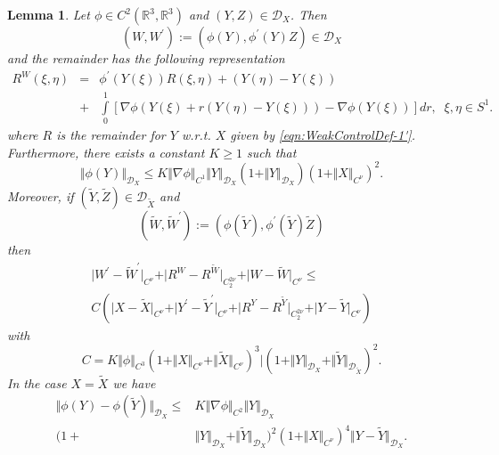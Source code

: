 \documentclass[11pt,a4paper,leqno]{amsart}%
\theoremstyle{plain}
\theoremstyle{remark}
\theoremstyle{plain}
\newtheorem{lemma}[theorem]{Lemma}
\numberwithin{equation}{section}
\def\Rnu{{\mathbb R}}
\def\intl{\int\limits}
\begin{document}
\begin{lemma}\label{lem:RegularMap}
Let $\phi\in C^2(\Rnu^3,\Rnu^3)$ and $(Y,Z)\in \mathcal{D}_X$.
Then
\begin{equation}
(W,W^\prime):=(\phi(Y),\phi^\prime(Y)Z)\in
\mathcal{D}_X\label{eqn:RegularMap-1}
\end{equation}
and the remainder has the following representation
\begin{eqnarray}
R^{W}(\xi,\eta)&=&\phi^\prime(Y(\xi))R(\xi,\eta)+
(Y(\eta)-Y(\xi))
\nonumber
\\&+&\intl_0^1[\nabla\phi(Y(\xi)+r(Y(\eta)-Y(\xi)))-\nabla\phi(Y(\xi))]dr,\;\;\xi,\eta\in
S^1.
\label{eqn:RegularMap-2}
\end{eqnarray}
where $R$ is the remainder for $Y$ w.r.t. $X$ given by
\eqref{eqn:WeakControlDef-1'}. Furthermore, there exists a
constant $K\geq 1$ such that
\begin{equation}
\Vert \phi(Y)\Vert_{\mathcal{D}_X}\leq
K\Vert \nabla\phi\Vert_{C^1}\Vert Y\Vert_{\mathcal{D}_X}(1+\Vert Y\Vert_{\mathcal{D}_X})(1+\Vert X\Vert_{C^{\nu}})^2.\label{eqn:RegularMap-3}
\end{equation}
Moreover, if $(\tilde{Y},\tilde{Z})\in \mathcal{D}_{\tilde{X}}$
and
$$
(\tilde{W},\tilde{W}^\prime):=(\phi(\tilde{Y}),\phi^\prime(\tilde{Y})\tilde{Z})
$$
then
\begin{equation}
\begin{split}
\label{eqn:RegularMap-4}
\vert W^\prime-\tilde{W}^\prime\vert_{C^{\nu}}+\vert R^W-R^{\tilde{W}}\vert_{C_2^{2\nu}}+\vert W-\tilde{W}\vert_{C^{\nu}}\leq\\
C(\vert X-\tilde{X}\vert_{C^{\nu}}+\vert Y^\prime-\tilde{Y}^\prime\vert_{C^{\nu}}+\vert R^Y-R^{\tilde{Y}}\vert_{C_2^{2\nu}}+\vert Y-\tilde{Y}\vert_{C^{\nu}})
\end{split}
\end{equation}
with
\begin{equation}
C=K\Vert \phi\Vert_{C^3}(1+\Vert X\Vert_{C^{\nu}}+\Vert \tilde{X}\Vert_{C^{\nu}})^3\vert (1+\Vert Y\Vert_{\mathcal{D}_X}+\Vert \tilde{Y}\Vert_{\mathcal{D}_{\tilde{X}}})^2.\label{eqn:RegularMap-4'}
\end{equation}
In the case $X=\tilde{X}$ we have
\begin{equation}
\label{eqn:RegularMap-4''}
\begin{split}
\Vert \phi(Y)-\phi(\tilde{Y})\Vert_{\mathcal{D}_X}\leq
& K\Vert \nabla\phi\Vert_{C^2}\Vert Y\Vert_{\mathcal{D}_X}\\
(1+&\Vert Y\Vert_{\mathcal{D}_X}+\Vert \tilde{Y}\Vert_{\mathcal{D}_X})^2(1+\Vert X\Vert_{C^{\nu}})^4
\Vert Y-\tilde{Y}\Vert_{\mathcal{D}_X}.
\end{split}
\end{equation}
\end{lemma}
\end{document}

